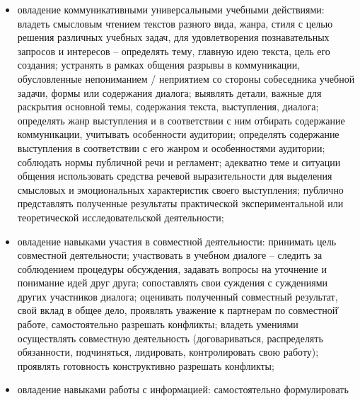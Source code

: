 \documentclass[
  11pt,
  russian,
]{book}
\begin{document}
\begin{itemize}
  осуществлять контроль результата (продукта) и процесса деятельности
  (степень освоения способа действия) по заданным и (или) самостоятельно
  определенным критериям; устанавливать приоритеты в деятельности,
  вносить коррективы в деятельность на основе новых обстоятельств,
  измененных ситуаций, установленных ошибок, возникших трудностей;
  прогнозировать последствия своих решений и действий; прогнозировать
  трудности, которые могут возникнуть при решении учебной задачи;
  объяснять причины успеха (неудач) в деятельности; сравнивать
  полученные результаты с исходной учебной задачей (достигнуто ли
  решение, каковы его сильные и слабые стороны);
\item
  овладение коммуникативными универсальными учебными действиями: владеть
  смысловым чтением текстов разного вида, жанра, стиля с целью решения
  различных учебных задач, для удовлетворения познавательных запросов и
  интересов -- определять тему, главную идею текста, цель его создания;
  устранять в рамках общения разрывы в коммуникации, обусловленные
  непониманием / неприятием со стороны собеседника учебной задачи, формы
  или содержания диалога; выявлять детали, важные для раскрытия основной
  темы, содержания текста, выступления, диалога; определять жанр
  выступления и в соответствии с ним отбирать содержание коммуникации,
  учитывать особенности аудитории; определять содержание выступления в
  соответствии с его жанром и особенностями аудитории; соблюдать нормы
  публичной речи и регламент; адекватно теме и ситуации общения
  использовать средства речевой выразительности для выделения смысловых
  и эмоциональных характеристик своего выступления; публично
  представлять полученные результаты практической экспериментальной или
  теоретической исследовательской деятельности;
\item
  овладение навыками участия в совместной деятельности: принимать цель
  совместной деятельности; участвовать в учебном диалоге -- следить за
  соблюдением процедуры обсуждения, задавать вопросы на уточнение и
  понимание идей друг друга; сопоставлять свои суждения с суждениями
  других участников диалога; оценивать полученный совместный результат,
  свой вклад в общее дело, проявлять уважение к партнерам по совместной̆
  работе, самостоятельно разрешать конфликты; владеть умениями
  осуществлять совместную деятельность (договариваться, распределять
  обязанности, подчиняться, лидировать, контролировать свою работу);
  проявлять готовность конструктивно разрешать конфликты;
\item
  овладение навыками работы с информацией: самостоятельно формулировать

\end{itemize}
\end{document}
